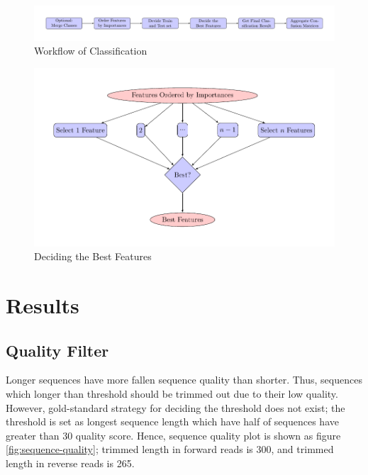 \documentclass[a4paper]{article}
\begin{document}
            \begin{figure}[p]
                \centering
                \includegraphics[width=0.8 \linewidth]{figures/Classifier/classifier.pdf}
                \caption{Workflow of Classification}
                \label{fig:classification}
            \end{figure}

            \begin{figure}[p]
                \centering
                \includegraphics[width=0.6 \linewidth]{figures/Classifier/best.pdf}
                \caption{Deciding the Best Features}
                \label{fig:deciding-best}
            \end{figure}

    \section{Results}
        \subsection{Quality Filter}
            Longer sequences have more fallen sequence quality than shorter. Thus, sequences which longer than threshold should be trimmed out due to their low quality. However, gold-standard strategy for deciding the threshold does not exist; the threshold is set as longest sequence length which have half of sequences have greater than 30 quality score. Hence, sequence quality plot is shown as figure \ref{fig:sequence-quality}; trimmed length in forward reads is 300, and trimmed length in reverse reads is 265.
\end{document}
